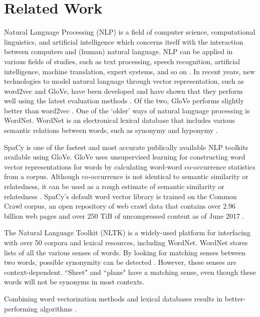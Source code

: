 \documentclass{article}
\begin{document}
\section{Related Work}

Natural Language Processing (NLP) is a field of computer science, computational linguistics, and artificial intelligence which concerns itself with the interaction between computers and (human) natural language. NLP can be applied in various fields of studies, such as text processing, speech recognition, artificial intelligence, machine translation, expert systems, and so on \citep{chowdhury2003natural}. 
In recent years, new technologies to model natural language through vector representation, such as word2vec and GloVe, have been developed \citep{mikolov2013efficient, pennington2014glove} and have shown that they perform well using the latest evaluation methods \citep{schnabel2015evaluation}. Of the two, GloVe performs slightly better than word2vec \citep{lee2016combining}.
One of the `older' ways of natural language processing is WordNet. WordNet is an electronical lexical database that includes various semantic relations between words, such as synonymy and hyponymy \citep{kilgarriff2000wordnet}.

SpaCy is one of the fastest and most accurate publically available NLP toolkits available \citep{choi2015depends} using GloVe. GloVe uses unsupervised learning for constructing word vector representations for words by calculating word-word co-occurrence statistics from a corpus. Although co-occurrence is not identical to semantic similarity or relatedness, it can be used as a rough estimate of semantic similarity or relatedness \citep{levy2015improving}. SpaCy's default word vector library is trained on the Common Crawl corpus, an open repository of web crawl data that contains over 2.96 billion web pages and over 250 TiB of uncompressed content as of June 2017 \citep{nagel2017commoncrawl}.

The Natural Language Toolkit (NLTK) is a widely-used platform for interfacing with over 50 corpora and lexical resources, including WordNet. WordNet stores lists of all the various senses of words. By looking for matching senses between two words, possible synonymity can be detected \cite{kilgarriff2000wordnet}. However, these senses are context-dependent. ``Sheet" and ``plane" have a matching sense, even though these words will not be synonyms in most contexts.

Combining word vectorization methods and lexical databases results in better-performing algorithms \cite{lee2016combining}. %
\end{document}
